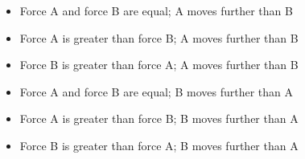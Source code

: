 \begin{itemize}
\item{} Force A and force B are equal; A moves further than B
\vskip 5pt 
\item{} Force A is greater than force B; A moves further than B 
\vskip 5pt 
\item{} Force B is greater than force A; A moves further than B 
\vskip 5pt 
\item{} Force A and force B are equal; B moves further than A
\vskip 5pt 
\item{} Force A is greater than force B; B moves further than A
\vskip 5pt 
\item{} Force B is greater than force A; B moves further than A 
\end{itemize}





